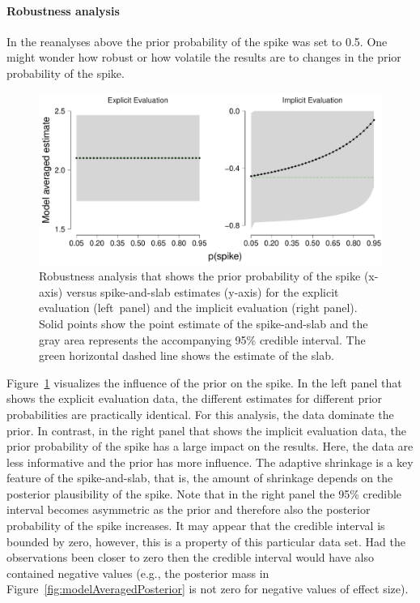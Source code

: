 \documentclass[a4paper]{article}
\newenvironment{revision}{\color{black}}{\color{black}}
\newenvironment{revision2}{\color{teal}}{\color{black}}
\begin{document}
\begin{revision}
\paragraph{Robustness analysis}
In the reanalyses above the prior probability of the spike was set to 0.5. One might wonder how robust or how volatile the results are to changes in the prior probability of the spike.
\begin{figure}[!ht]
	\centering
	\includegraphics[width=\textwidth]{robustnessReanalysis_big_font.pdf}
	\caption{%
		Robustness analysis that shows the prior probability of the spike (x-axis) versus spike-and-slab estimates (y-axis) for the explicit evaluation (left~panel) and the implicit evaluation (right panel).
		Solid points show the point estimate of the spike-and-slab and the gray area represents the accompanying 95\% credible interval.
		The green horizontal dashed line shows the estimate of the slab.
	}
	\label{fig:robustnessReanalysis}
\end{figure}
Figure~\ref{fig:robustnessReanalysis} visualizes the influence of the prior on the spike. 
In the left panel that shows the explicit evaluation data, the different estimates for different prior probabilities are practically identical. 
For this analysis, the data dominate the prior.
In contrast, in the right panel that shows the \begin{revision2}implicit\end{revision2} evaluation data, the prior probability of the spike has a large impact on the results.
Here, the data are less informative and the prior has more influence.
The adaptive shrinkage is a key feature of the spike-and-slab, that is, the amount of shrinkage depends on the posterior plausibility of the spike.
\begin{revision2}
Note that in the right panel the 95\% credible interval becomes asymmetric as the prior and therefore also the posterior probability of the spike increases. It may appear that the credible interval is bounded by zero, however, this is a property of this particular data set. Had the observations been closer to zero then the credible interval would have also contained negative values (e.g., the posterior mass in Figure~\ref{fig:modelAveragedPosterior} is not zero for negative values of effect size).
\end{revision2}
\end{revision}
\end{document}
